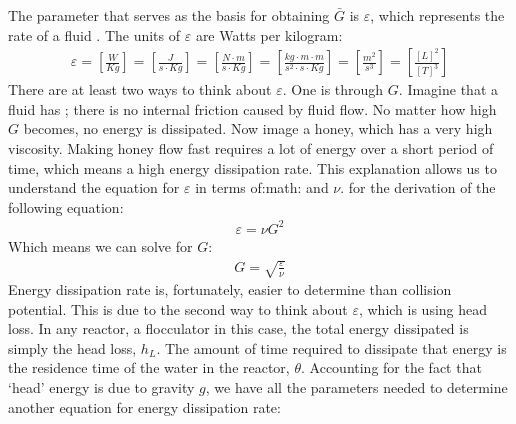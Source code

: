 \documentclass[letterpaper,10pt,english]{sphinxmanual}
\begin{document}
The parameter that serves as the basis for obtaining \(\bar G\) is \(\varepsilon\), which represents the  rate of a fluid . The units of \(\varepsilon\) are Watts per kilogram:
\begin{equation}\label{equation:Flocculation/Floc_Design:Flocculation/Floc_Design:1}
\begin{split}\varepsilon = \left[ \frac{W}{Kg} \right] = \left[ \frac{J}{s \cdot Kg} \right] = \left[ \frac{N \cdot m}{s \cdot Kg} \right] = \left[ \frac{kg \cdot m \cdot m}{s^2 \cdot s \cdot Kg} \right] = \left[ \frac{m^2}{s^3} \right] = \left[ \frac{[L]^2}{[T]^3} \right]\end{split}
\end{equation}
There are at least two ways to think about \(\varepsilon\). One is through \(G\). Imagine that a fluid has  ; there is no internal friction caused by fluid flow. No matter how high \(G\) becomes, no energy is dissipated. Now image a honey, which has a very high viscosity. Making honey flow fast requires a lot of energy over a short period of time, which means a high energy dissipation rate. This explanation allows us to understand the equation for \(\varepsilon\) in terms of:math: and \(\nu\).  for the derivation of the following equation:
\begin{equation}\label{equation:Flocculation/Floc_Design:Flocculation/Floc_Design:2}
\begin{split}\varepsilon = \nu G^2\end{split}
\end{equation}
Which means we can solve for \(G\):
\begin{equation}\label{equation:Flocculation/Floc_Design:Flocculation/Floc_Design:3}
\begin{split}G = \sqrt{\frac{\varepsilon}{\nu}}\end{split}
\end{equation}
Energy dissipation rate is, fortunately, easier to determine than collision potential. This is due to the second way to think about \(\varepsilon\), which is using head loss. In any reactor, a flocculator in this case, the total energy dissipated is simply the head loss, \(h_L\). The amount of time required to dissipate that energy is the residence time of the water in the reactor, \(\theta\). Accounting for the fact that ‘head’ energy is due to gravity \(g\), we have all the parameters needed to determine another equation for energy dissipation rate:
\end{document}

